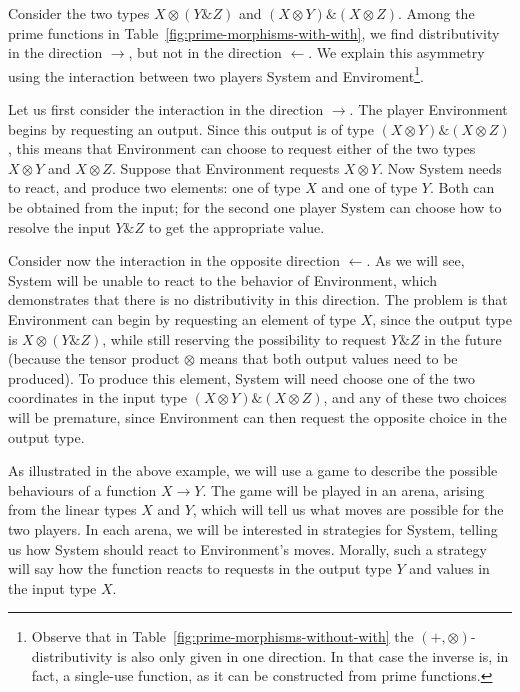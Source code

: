 \documentclass[a4paper,UKenglish,cleveref, autoref, numberwithinsect, thm-restate]{lipics-v2021}
\begin{document}
\begin{example}\label{ex:amp-otimes-distr}
    Consider the two types $X \otimes (Y \& Z)$ and $(X \otimes Y) \& (X \otimes Z)$.
    Among the prime functions in Table~\ref{fig:prime-morphisms-with-with}, we find distributivity in the direction $\rightarrow$, but not in the direction $\leftarrow$. We explain this asymmetry using the interaction between two players System and Enviroment\footnote{
        Observe that in Table~\ref{fig:prime-morphisms-without-with} the $(+, \otimes)$-distributivity is also only given in one direction. In that case the inverse is, in fact, a single-use function, as it can be constructed from prime functions.
    }.

    Let us first consider the interaction in the  direction $\rightarrow$. The player Environment begins by requesting an output. Since this output is of type $(X \otimes Y) \& (X \otimes Z)$, this means that Environment can choose to request either of the two types  $X \otimes Y$ and $X \otimes Z$. Suppose that Environment requests $X \otimes Y$. Now System needs to react, and produce two elements: one of type $X$ and one of type $Y$. Both can be obtained from the input; for the second one player System can choose how to resolve the input $Y \& Z$ to get the appropriate value. 

    Consider now the interaction in the opposite direction $\leftarrow$. As we will see, System will be unable to react to the behavior of Environment, which demonstrates that there is no distributivity in this direction. The problem is that Environment can begin by requesting an element of type $X$, since the output type is $X \otimes (Y \& Z)$, while still reserving the possibility to request $Y \& Z$ in the future (because the tensor product $\otimes$ means that both output values need to be produced). To produce this element, System will need  choose one of the two coordinates in the input type $(X \otimes Y) \& (X \otimes Z)$, and any of these two  choices will be premature, since Environment can then request the opposite choice in the output type.  \exampleend
\end{example}

As illustrated in the above example, we will use a game to describe the possible behaviours of a function $X \to Y$. The game will be played in an arena, arising from the linear types $X$ and $Y$, which will tell us what moves are possible for the two players. In each arena, we will be interested in strategies for System, telling us how System should react to Environment's moves. Morally, such a strategy will say how the function reacts to requests in the output type $Y$ and values in the input type $X$.
\end{document}
